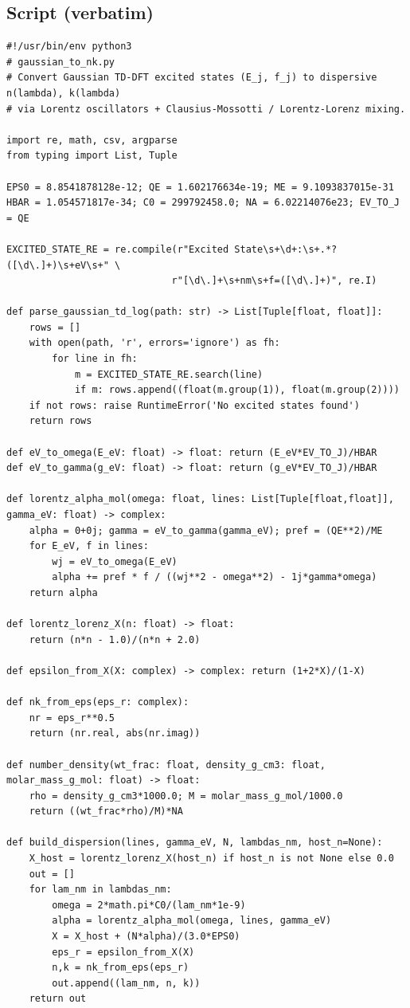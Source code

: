 \documentclass[11pt,a4paper]{article}
\begin{document}
\subsection*{Script (verbatim)}
\begin{verbatim}
#!/usr/bin/env python3
# gaussian_to_nk.py
# Convert Gaussian TD-DFT excited states (E_j, f_j) to dispersive n(lambda), k(lambda)
# via Lorentz oscillators + Clausius-Mossotti / Lorentz-Lorenz mixing.

import re, math, csv, argparse
from typing import List, Tuple

EPS0 = 8.8541878128e-12; QE = 1.602176634e-19; ME = 9.1093837015e-31
HBAR = 1.054571817e-34; C0 = 299792458.0; NA = 6.02214076e23; EV_TO_J = QE

EXCITED_STATE_RE = re.compile(r"Excited State\s+\d+:\s+.*?([\d\.]+)\s+eV\s+" \
                             r"[\d\.]+\s+nm\s+f=([\d\.]+)", re.I)

def parse_gaussian_td_log(path: str) -> List[Tuple[float, float]]:
    rows = []
    with open(path, 'r', errors='ignore') as fh:
        for line in fh:
            m = EXCITED_STATE_RE.search(line)
            if m: rows.append((float(m.group(1)), float(m.group(2))))
    if not rows: raise RuntimeError('No excited states found')
    return rows

def eV_to_omega(E_eV: float) -> float: return (E_eV*EV_TO_J)/HBAR
def eV_to_gamma(g_eV: float) -> float: return (g_eV*EV_TO_J)/HBAR

def lorentz_alpha_mol(omega: float, lines: List[Tuple[float,float]], gamma_eV: float) -> complex:
    alpha = 0+0j; gamma = eV_to_gamma(gamma_eV); pref = (QE**2)/ME
    for E_eV, f in lines:
        wj = eV_to_omega(E_eV)
        alpha += pref * f / ((wj**2 - omega**2) - 1j*gamma*omega)
    return alpha

def lorentz_lorenz_X(n: float) -> float:
    return (n*n - 1.0)/(n*n + 2.0)

def epsilon_from_X(X: complex) -> complex: return (1+2*X)/(1-X)

def nk_from_eps(eps_r: complex):
    nr = eps_r**0.5
    return (nr.real, abs(nr.imag))

def number_density(wt_frac: float, density_g_cm3: float, molar_mass_g_mol: float) -> float:
    rho = density_g_cm3*1000.0; M = molar_mass_g_mol/1000.0
    return ((wt_frac*rho)/M)*NA

def build_dispersion(lines, gamma_eV, N, lambdas_nm, host_n=None):
    X_host = lorentz_lorenz_X(host_n) if host_n is not None else 0.0
    out = []
    for lam_nm in lambdas_nm:
        omega = 2*math.pi*C0/(lam_nm*1e-9)
        alpha = lorentz_alpha_mol(omega, lines, gamma_eV)
        X = X_host + (N*alpha)/(3.0*EPS0)
        eps_r = epsilon_from_X(X)
        n,k = nk_from_eps(eps_r)
        out.append((lam_nm, n, k))
    return out


\end{verbatim}
\end{document}
